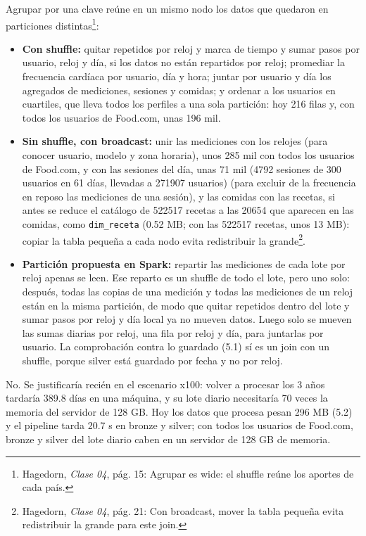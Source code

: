 \documentclass[11pt]{article}
\begin{document}
 Agrupar por una clave reúne en un
mismo nodo los datos que quedaron en particiones distintas\footnote{Hagedorn,
\emph{Clase 04}, pág. 15: \textquotedbl{}Agrupar es wide: el shuffle reúne los
aportes de cada país\textquotedbl{}.}:
\begin{itemize}
  \item \textbf{Con shuffle:} quitar repetidos por reloj y marca de tiempo y
  sumar pasos por usuario, reloj y día, si los datos no están repartidos por
  reloj; promediar la frecuencia cardíaca por usuario, día y hora; juntar
  por usuario y día los agregados de mediciones, sesiones y comidas; y ordenar
  a los usuarios en cuartiles, que lleva todos los perfiles a una sola
  partición: hoy 216 filas y, con todos los usuarios de Food.com, unas 196 mil.
  \item \textbf{Sin shuffle, con broadcast:} unir las mediciones con los relojes
  (para conocer usuario, modelo y zona horaria), unos 285 mil con todos los
  usuarios de Food.com, y con las sesiones del día, unas 71 mil (4792 sesiones
  de 300 usuarios en 61 días, llevadas a 271907 usuarios) (para excluir de la frecuencia en reposo las mediciones de una
  sesión), y las comidas con las recetas, si antes se reduce
  el catálogo de 522517 recetas a las 20654 que aparecen en las comidas, como
  \texttt{dim\_receta} (0.52 MB; con las 522517 recetas, unos 13 MB): copiar la tabla pequeña a cada nodo evita redistribuir
  la grande\footnote{Hagedorn, \emph{Clase 04}, pág. 21: \textquotedbl{}Con
  broadcast, mover la tabla pequeña evita redistribuir la grande para este
  join\textquotedbl{}.}.
  \item \textbf{Partición propuesta en Spark:} repartir las mediciones de
  cada lote por reloj apenas se leen. Ese reparto es un shuffle de todo el
  lote, pero uno solo: después, todas las copias de una medición y todas las
  mediciones de un reloj están en la misma partición, de modo que quitar
  repetidos dentro del lote y sumar pasos por reloj y día local ya no mueven
  datos. Luego solo se mueven las sumas diarias por reloj, una fila por reloj
  y día, para juntarlas por usuario. La comprobación contra lo guardado (5.1)
  sí es un join con un shuffle, porque silver está guardado por fecha y no por
  reloj.
\end{itemize}

 No. Se
justificaría recién en el escenario x100: volver a procesar los 3 años tardaría 389.8
días en una máquina, y su lote diario necesitaría 70 veces la memoria del
servidor de 128 GB. Hoy los datos que procesa pesan 296 MB (5.2) y el pipeline tarda 20.7 s en bronze y
silver; con todos los usuarios de Food.com, bronze y silver del lote diario caben en
un servidor de 128 GB de memoria.
\end{document}
